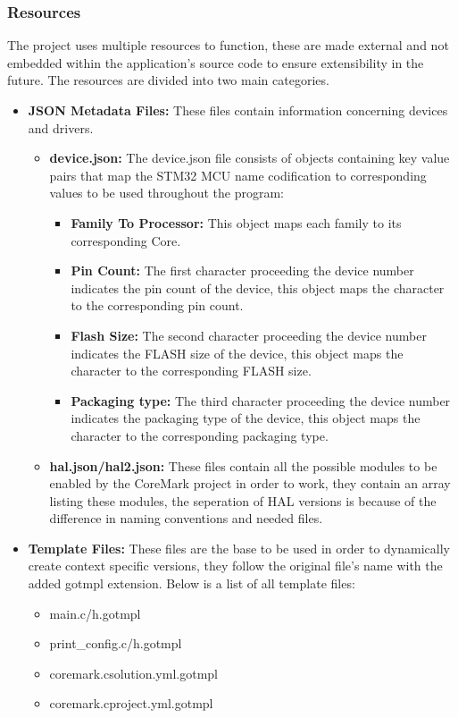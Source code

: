 \subsubsection{Resources}
The project uses multiple resources to function, these are made external and not embedded within the application's source code to ensure extensibility in the future. The resources are divided into two main categories.
\begin{itemize}
    \item \textbf{JSON Metadata Files:} These files contain information concerning devices and drivers.
        \begin{itemize}
            \item \textbf{device.json:} The device.json file consists of objects containing key value pairs that map the STM32 MCU name codification to corresponding values to be used throughout the program:
                \begin{itemize}
                    \item \textbf{Family To Processor:} This object maps each family to its corresponding Core.
                    \item \textbf{Pin Count:} The first character proceeding the device number indicates the pin count of the device, this object maps the character to the corresponding pin count.
                    \item \textbf{Flash Size:} The second character proceeding the device number indicates the FLASH size of the device, this object maps the character to the corresponding FLASH size.
                    \item \textbf{Packaging type:} The third character proceeding the device number indicates the packaging type of the device, this object maps the character to the corresponding packaging type.
                \end{itemize}
            \item \textbf{hal.json/hal2.json:} These files contain all the possible modules to be enabled by the CoreMark project in order to work, they contain an array listing these modules, the seperation of HAL versions is because of the difference in naming conventions and needed files.
        \end{itemize}
    \item \textbf{Template Files:} These files are the base to be used in order to dynamically create context specific versions, they follow the original file's name with the added gotmpl extension. Below is a list of all template files:
        \begin{itemize}
            \item main.c/h.gotmpl
            \item print\_config.c/h.gotmpl
            \item coremark.csolution.yml.gotmpl
            \item coremark.cproject.yml.gotmpl
        \end{itemize}
\end{itemize}
